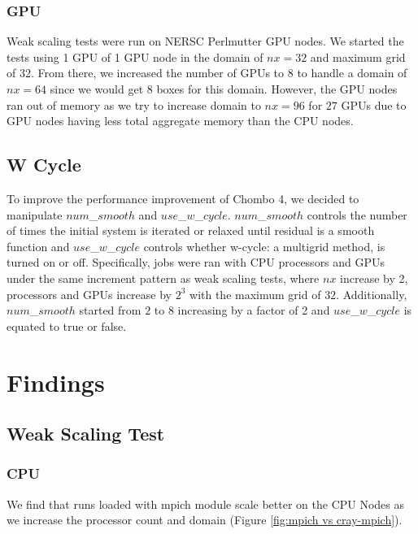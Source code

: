 \documentclass{article}
\begin{document}
\subsubsection{GPU}
Weak scaling tests were run on NERSC Perlmutter GPU nodes. We started the tests using 1 GPU of 1 GPU node in the domain of $nx=32$ and maximum grid of $32$. From there, we increased the number of GPUs to $8$ to handle a domain of $nx=64$ since we would get 8 boxes for this domain. However, the GPU nodes ran out of memory as we try to increase domain to $nx=96$ for $27$ GPUs due to GPU nodes having less total aggregate memory than the CPU nodes.

\subsection{W Cycle}
To improve the performance improvement of Chombo 4, we decided to manipulate $num$\_$smooth$ and $use$\_$w$\_$cycle$. $num$\_$smooth$ controls the number of times the initial system is iterated or relaxed until residual is a smooth function and $use$\_$w$\_$cycle$ controls whether w-cycle: a multigrid method, is turned on or off. 
Specifically, jobs were ran with CPU processors and GPUs under the same increment pattern as weak scaling tests, where $nx$ increase by 2, processors and GPUs increase by $2^3$ with the maximum grid of $32$. Additionally, $num$\_$smooth$ started from $2$ to $8$ increasing by a factor of 2 and $use$\_$w$\_$cycle$ is equated to true or false.

\section{Findings}
\subsection{Weak Scaling Test}
\subsubsection{CPU}

We find that runs loaded with mpich module scale better on the CPU Nodes as we increase the processor count and domain (Figure \ref{fig:mpich vs cray-mpich}).
\end{document}
